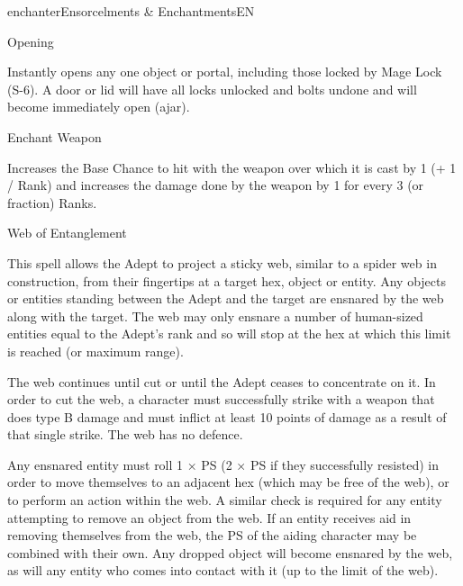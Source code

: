 \begin{College}[1.1]{enchanter}{Ensorcelments \& Enchantments}{EN}
\begin{spell}[S-3]{Opening}

\begin{effects}
Instantly opens any one object or portal, including those locked by
Mage Lock (S-6).  A door or lid will have all locks unlocked and bolts
undone and will become immediately open (ajar).
\end{effects}
\end{spell}

\begin{spell}[S-4]{Enchant Weapon}

\begin{effects}
Increases the Base Chance to hit with the weapon over which it is cast
by 1 (+ 1 / Rank) and increases the damage done by the weapon by 1 for
every 3 (or fraction) Ranks.
\end{effects}
\end{spell}

\begin{spell}[S-5]{Web of Entanglement}

\begin{effects}
This spell allows the Adept to project a sticky web, similar to a
spider web in construction, from their fingertips at a target hex,
object or entity.  Any objects or entities standing between the Adept
and the target are ensnared by the web along with the target. The web
may only ensnare a number of human-sized entities equal to the Adept’s
rank and so will stop at the hex at which this limit is reached (or
maximum range).

The web continues until cut or until the Adept ceases to concentrate
on it. In order to cut the web, a character must successfully strike
with a weapon that does type B damage and must inflict at least 10
points of damage as a result of that single strike.  The web has no
defence.

Any ensnared entity must roll 1 × PS (2 × PS if they successfully
resisted) in order to move themselves to an adjacent hex (which may
be free of the web), or to perform an action within the web.  A
similar check is required for any entity attempting to remove an
object from the web.  If an entity receives aid in removing themselves
from the web, the PS of the aiding character may be combined with
their own.  Any dropped object will become ensnared by the web, as
will any entity who comes into contact with it (up to the limit of the
web).
\end{effects}
\end{spell}


\end{College}
